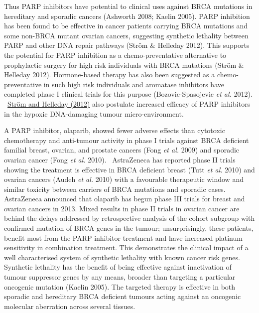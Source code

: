 Thus PARP inhibitors have potential to clinical uses against BRCA
mutations in hereditary and sporadic cancers (Ashworth 2008; Kaelin
2005). PARP inhibition has been found to be effective in cancer
patients carrying BRCA mutations and some non-BRCA mutant ovarian
cancers, suggesting synthetic lethality between PARP and other DNA
repair pathways (Str\"om \& Helleday 2012). This supports the
potential for PARP inhibition as a chemo-preventative alternative to
prophylactic surgery for high risk individuals with BRCA mutations
(Str\"om \& Helleday 2012). Hormone-based therapy has also been
suggested as a chemo-preventative in such high risk individuals and
aromatase inhibitors have completed phase I clinical trials for this
purpose (Bozovic-Spasojevic\textit{ et al.} 2012).
\ \hyperlink{ENREF91}{Str\"om and Helleday (2012)} also postulate
increased efficacy of PARP inhibitors in the hypoxic DNA-damaging
tumour micro-environment. 


A PARP inhibitor, olaparib, showed fewer adverse effects than cytotoxic
chemotherapy and anti-tumour activity in phase I trials against BRCA
deficient familial breast, ovarian, and prostate cancers (Fong\textit{
et al.} 2009) and sporadic ovarian cancer (Fong\textit{ et al.} 2010).
\ AstraZeneca has reported phase II trials showing the treatment is
effective in BRCA deficient breast (Tutt\textit{ et al.} 2010) and
ovarian cancers (Audeh\textit{ et al.} 2010) with a favourable
therapeutic window and similar toxicity between carriers of BRCA
mutations and sporadic cases. AstraZeneca announced that olaparib has
begun phase III trials for breast and ovarian cancers in 2013. Mixed
results in phase II trials in ovarian cancer are behind the delays
addressed by retrospective analysis of the cohort subgroup with
confirmed mutation of BRCA genes in the tumour; unsurprisingly, these
patients, benefit most from the PARP inhibitor treatment and have
increased platinum sensitivity in combination treatment. This
demonstrates the clinical impact of a well characterised system of
synthetic lethality with known cancer risk genes. Synthetic lethality
has the benefit of being effective against inactivation of tumour
suppressor genes by any means, broader than targeting a particular
oncogenic mutation (Kaelin 2005). The targeted therapy is effective
in both sporadic and hereditary BRCA deficient tumours acting against
an oncogenic molecular aberration across several tissues. 


